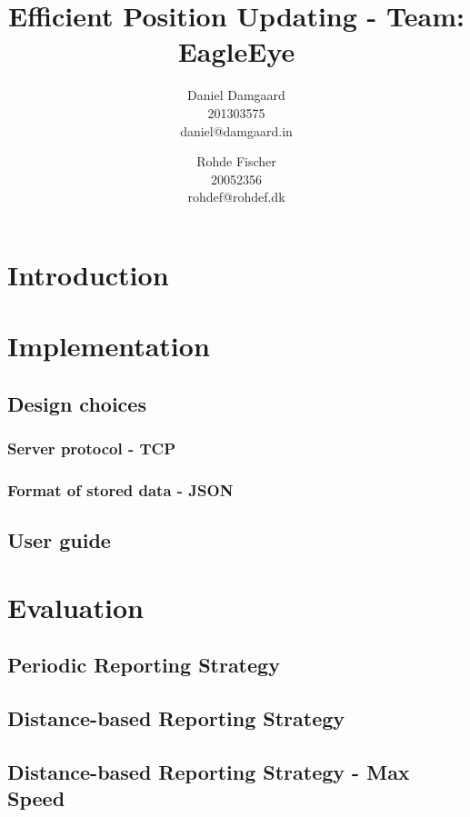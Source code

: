 \documentclass[10pt,a4paper,twocolumn]{article}
\author{Daniel Damgaard \\
201303575 \\
daniel@damgaard.in
\and
Rohde Fischer \\
20052356 \\
rohdef@rohdef.dk
}
\title{Efficient Position Updating - Team: EagleEye}
\begin{document}
\maketitle

\tableofcontents

\section{Introduction}


\section{Implementation}


\subsection{Design choices}


\subsubsection{Server protocol - TCP}


\subsubsection{Format of stored data - JSON}


\subsection{User guide}


\section{Evaluation}


\subsection{Periodic Reporting Strategy}


\subsection{Distance-based Reporting Strategy}


\subsection{Distance-based Reporting Strategy - Max Speed}

\end{document}
